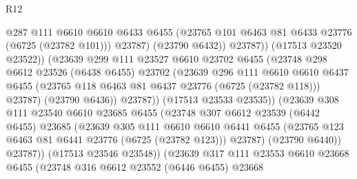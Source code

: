 \begin{lexlean}{R12}
\begin{coremodule}
                                  @287
                                  @111
                                  @6610
                                  @6610
                                  @6433
                                  @6455
                                  (@23765 @101 @6463 @81 @6433 @23776 (@6725 (@23782 @101)))
                                  @23787)
                                (@23790 @6432))
                              @23787))
                          (@17513 @23520 @23522))
                        (@23639
                          @299
                          @111
                          @23527
                          @6610
                          @23702
                          @6455
                          (@23748
                            @298
                            @6612
                            @23526
                            (@6438 @6455)
                            @23702
                            (@23639
                              @296
                              @111
                              @6610
                              @6610
                              @6437
                              @6455
                              (@23765 @118 @6463 @81 @6437 @23776 (@6725 (@23782 @118)))
                              @23787)
                            (@23790 @6436))
                          @23787))
                      (@17513 @23533 @23535))
                    (@23639
                      @308
                      @111
                      @23540
                      @6610
                      @23685
                      @6455
                      (@23748
                        @307
                        @6612
                        @23539
                        (@6442 @6455)
                        @23685
                        (@23639
                          @305
                          @111
                          @6610
                          @6610
                          @6441
                          @6455
                          (@23765 @123 @6463 @81 @6441 @23776 (@6725 (@23782 @123)))
                          @23787)
                        (@23790 @6440))
                      @23787))
                  (@17513 @23546 @23548))
                (@23639
                  @317
                  @111
                  @23553
                  @6610
                  @23668
                  @6455
                  (@23748
                    @316
                    @6612
                    @23552
                    (@6446 @6455)
                    @23668

\end{coremodule}
\end{lexlean}
